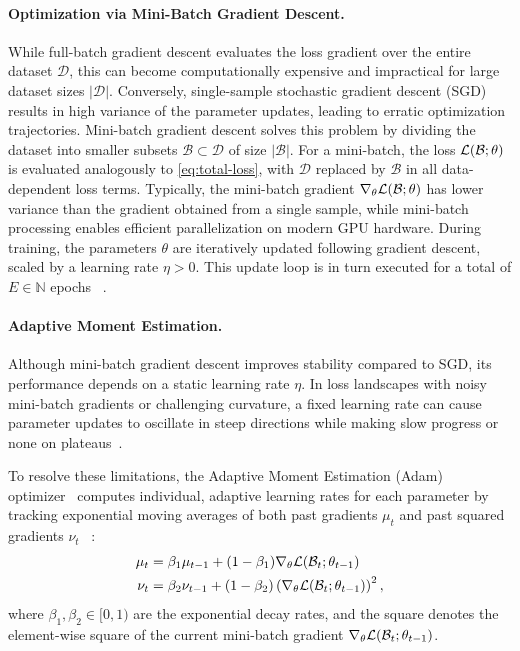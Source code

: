 \paragraph{Optimization via Mini-Batch Gradient Descent.}
While full-batch gradient descent evaluates the loss gradient over the entire dataset $\mathcal{D}$, 
this can become computationally expensive and impractical for large dataset sizes $|\mathcal{D}|$. 
Conversely, single-sample stochastic gradient descent (SGD) results in high variance of the parameter updates, 
leading to erratic optimization trajectories. Mini-batch gradient descent solves this problem by dividing the 
dataset into smaller subsets $\mathcal{B} \subset \mathcal{D}$ of size $|\mathcal{B}|$. For a mini-batch, 
the loss $\mathcal{L}(\mathcal{B}; \theta)$ is evaluated analogously to \cref{eq:total-loss}, 
with $\mathcal{D}$ replaced by $\mathcal{B}$ in all data-dependent loss terms. 
Typically, the mini-batch gradient $\nabla_\theta \mathcal{L}(\mathcal{B}; \theta)$ has lower variance than the gradient obtained from a single sample, 
while mini-batch processing enables efficient parallelization on modern GPU hardware.
During training, the parameters $\theta$ are iteratively updated following gradient descent, scaled by a 
learning rate $\eta > 0$. This update loop is in turn executed for a total of $E \in \mathbb{N}$ epochs~
.


\paragraph{Adaptive Moment Estimation.}
Although mini-batch gradient descent improves stability compared to SGD, its performance depends on 
a static learning rate $\eta$. In loss landscapes with noisy mini-batch gradients or challenging curvature, 
a fixed learning rate can cause parameter updates to oscillate in steep directions while 
making slow progress or none on plateaus~.

To resolve these limitations, the Adaptive Moment Estimation (Adam) optimizer~\cite{kingmaAdamMethodStochastic2015} 
computes individual, adaptive learning rates for each parameter by tracking exponential moving averages of both past 
gradients $\mu_t$ and past squared gradients $\nu_t$~
:
\begin{subequations}
    \begin{align}
        \label{eq:adam-moments}
        \mu_t &= \beta_1 \mu_{t-1} + (1 - \beta_1) \nabla_\theta \mathcal{L}(\mathcal{B}_t; \theta_{t-1}) \\
        \nu_t &= \beta_2 \nu_{t-1} + (1 - \beta_2) \left(\nabla_\theta \mathcal{L}(\mathcal{B}_t; \theta_{t-1})\right)^2,
    \end{align}
\end{subequations}
where $\beta_1, \beta_2 \in [0, 1)$ are the exponential decay rates, and the square denotes the element-wise 
square of the current mini-batch gradient $\nabla_\theta \mathcal{L}(\mathcal{B}_t; \theta_{t-1})$. 

